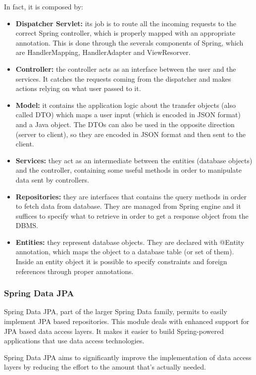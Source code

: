 \documentclass[table, 12pt]{article}
\begin{document}
In fact, it is composed by:
\begin{itemize}
    \item \textbf{Dispatcher Servlet:} its job is to route all the incoming requests to the correct Spring controller, which is properly mapped with an appropriate annotation. This is done through the severals components of Spring, which are HandlerMapping, HandlerAdapter and ViewResorver.
    \item \textbf{Controller:} the controller acts as an interface between the user and the services. It catches the requests coming from the dispatcher and makes actions relying on what user passed to it.
    \item \textbf{Model:} it contains the application logic about the transfer objects (also called DTO) which maps a user input (which is encoded in JSON format) and a Java object. The DTOs can also be used in the opposite direction (server to client), so they are encoded in JSON format and then sent to the client.
    \item \textbf{Services:} they act as an intermediate between the entities (database objects) and the controller, containing some useful methods in order to manipulate data sent by controllers.
    \item \textbf{Repositories:} they are interfaces that contains the query methods in order to fetch data from database. They are managed from Spring engine and it suffices to specify what to retrieve in order to get a response object from the DBMS.
    \item \textbf{Entities:} they represent database objects. They are declared with @Entity annotation, which maps the object to a database table (or set of them). Inside an entity object it is possible to specify constraints and foreign references through proper annotations.
\end{itemize}

\subsubsection{Spring Data JPA}
Spring Data JPA, part of the larger Spring Data family, permits to easily implement JPA based repositories. This module deals with enhanced support for JPA based data access layers. It makes it easier to build Spring-powered applications that use data access technologies.

Spring Data JPA aims to significantly improve the implementation of data access layers by reducing the effort to the amount that’s actually needed.
\end{document}
